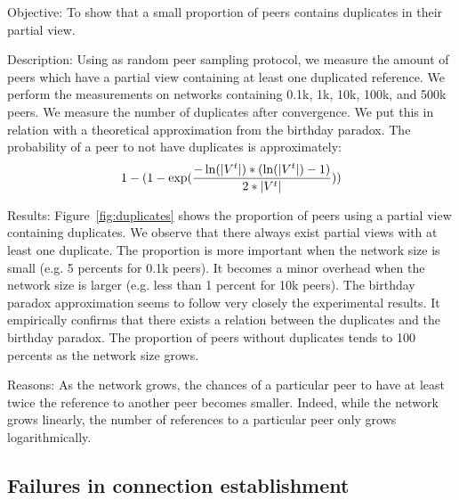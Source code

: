 \begin{asparadesc} 
\item[Objective:] To show that a small proportion of peers contains duplicates
  in their partial view.
\item[Description:] Using \SPRAY as random peer sampling protocol, we measure
  the amount of peers which have a partial view containing at least one
  duplicated reference. We perform the measurements on networks containing
  0.1k, 1k, 10k, 100k, and 500k peers. We measure the number of duplicates
  after convergence. We put this in relation with a theoretical approximation
  from the birthday paradox. The probability of a peer to not have duplicates
  is approximately:
  \begin{equation*}
    1- 
    (1-
    \exp({-\ln(|V^t|)*(\ln(|V^t|)-1)\over{2*|V^t|}}))
  \end{equation*}
\item[Results:] Figure~\ref{fig:duplicates} shows the proportion of peers using
  a partial view containing duplicates. We observe that there always exist
  partial views with at least one duplicate. The proportion is more important
  when the network size is small (e.g. 5 percents for 0.1k peers). It becomes a
  minor overhead when the network size is larger (e.g. less than 1 percent for
  10k peers). The birthday paradox approximation seems to follow very closely
  the experimental results. It empirically confirms that there exists a relation
  between the duplicates and the birthday paradox. The proportion of peers
  without duplicates tends to 100 percents as the network size grows.
\item[Reasons:] As the network grows, the chances of a particular peer to have
  at least twice the reference to another peer becomes smaller. Indeed, while
  the network grows linearly, the number of references to a particular peer
  only grows logarithmically. %
\end{asparadesc}


\subsection{Failures in connection establishment}
\label{subsec:degeneration}


